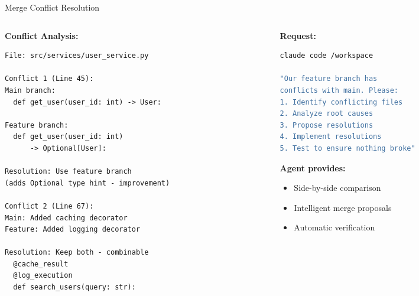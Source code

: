 \documentclass[aspectratio=169,11pt]{beamer}
\begin{document}
\begin{frame}[fragile]{Merge Conflict Resolution}
    \begin{columns}[T]
        \begin{column}{0.48\textwidth}
            \textbf{Conflict Analysis:}
            \begin{lstlisting}[basicstyle=\ttfamily\tiny]
File: src/services/user_service.py

Conflict 1 (Line 45):
Main branch:
  def get_user(user_id: int) -> User:

Feature branch:
  def get_user(user_id: int)
      -> Optional[User]:

Resolution: Use feature branch
(adds Optional type hint - improvement)

Conflict 2 (Line 67):
Main: Added caching decorator
Feature: Added logging decorator

Resolution: Keep both - combinable
  @cache_result
  @log_execution
  def search_users(query: str):
            \end{lstlisting}
        \end{column}
        \begin{column}{0.48\textwidth}
            \textbf{Request:}
            \begin{lstlisting}[language=bash, basicstyle=\ttfamily\small]
claude code /workspace

"Our feature branch has
conflicts with main. Please:
1. Identify conflicting files
2. Analyze root causes
3. Propose resolutions
4. Implement resolutions
5. Test to ensure nothing broke"
            \end{lstlisting}

            \vspace{0.3cm}
            \textbf{Agent provides:}
            \begin{itemize}
                \item Side-by-side comparison
                \item Intelligent merge proposals
                \item Automatic verification
            \end{itemize}
        \end{column}
    \end{columns}

\end{frame}

\end{document}
